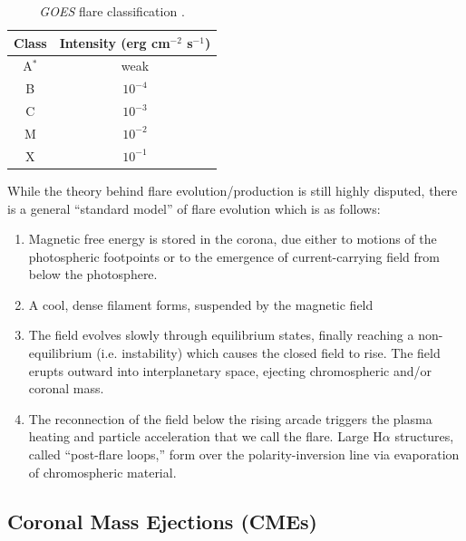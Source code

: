 	\begin{table}
		\centering
		\begin{tabular}{cc}
			\hline
			\hline
			Class & Intensity (erg cm$^{-2}$ s$^{-1}$) \\ \hline
			A$^{*}$ & weak \\
			B & $10^{-4}$ \\
			C & $10^{-3}$ \\
			M & $10^{-2}$ \\
			X & $10^{-1}$ \\ \hline\hline
		\end{tabular}
		\caption{\textit{GOES} flare classification \citep{golub_solar_2010}.}
		\label{tab:goes_class}
	\end{table}

	While the theory behind flare evolution/production is still highly disputed, there is a general ``standard model'' of flare evolution which is as follows:
	\begin{enumerate}
		\item Magnetic free energy is stored in the corona, due either to motions of the photospheric footpoints or to the emergence of current-carrying field from below the photosphere. 
		\item A cool, dense filament forms, suspended by the magnetic field
		\item The field evolves slowly through equilibrium states, finally reaching a non-equilibrium (i.e. instability) which causes the closed field to rise. The field erupts outward into interplanetary space, ejecting chromospheric and/or coronal mass.
		\item The reconnection of the field below the rising arcade triggers the plasma heating and particle acceleration that we call the flare. Large H$\alpha$ structures, called ``post-flare loops,'' form over the polarity-inversion line via evaporation of chromospheric material.
	\end{enumerate}
		
	\subsection{Coronal Mass Ejections (CMEs)}
	
